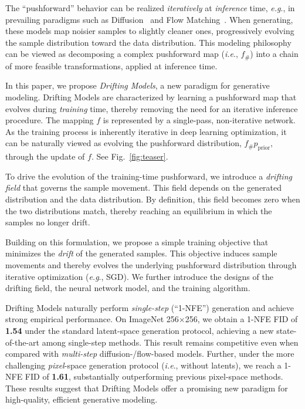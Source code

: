 \documentclass{article}
\def\onedot{.}
\def\eg{\emph{e.g}\onedot} \def\Eg{\emph{E.g}\onedot}
\def\ie{\emph{i.e}\onedot} \def\Ie{\emph{I.e}\onedot}
\theoremstyle{plain}
\theoremstyle{definition}
\theoremstyle{remark}
\begin{document}
The ``pushforward'' behavior can be realized \textit{iteratively} at \textit{inference} time, \eg, in prevailing paradigms such as Diffusion~\cite{sohl2015deep} and Flow Matching~\cite{lipman2022flow}. When generating, these models map noisier samples to slightly cleaner ones, progressively evolving the sample distribution toward the data distribution.
This modeling philosophy can be viewed as decomposing a complex pushforward map (\ie, $f_\#$) into a chain of more feasible transformations, applied at inference time.

In this paper, we propose \emph{Drifting Models}, a new paradigm for generative
modeling. Drifting Models are characterized by learning a pushforward map that evolves during \textit{training} time, thereby removing the need for an iterative inference procedure. The mapping $f$ is represented by a single-pass, non-iterative network. As the training process is inherently iterative in deep learning optimization, it can be naturally viewed as evolving the pushforward
distribution, $f_\# p_\text{prior}$, through the update of $f$. See Fig.~\ref{fig:teaser}.

To drive the evolution of the training-time pushforward, we introduce a
\emph{drifting field} that governs the sample movement.
This field depends on the generated distribution and the data distribution.
By definition, this field becomes zero when the two distributions match, thereby reaching an equilibrium in which the samples no longer drift.

Building on this formulation, we propose a simple training objective that minimizes the \textit{drift} of the generated samples. This objective induces sample movements and thereby evolves the underlying pushforward distribution through iterative optimization (\eg, SGD). We further introduce the designs of the drifting field, the neural network model, and the training algorithm.

Drifting Models naturally perform \textit{single-step} (\mbox{``1-NFE''}) generation and achieve strong empirical performance.
On ImageNet 256$\times$256, we obtain a 1-NFE
FID of \textbf{1.54} under the standard latent-space generation protocol, achieving a new state-of-the-art among single-step methods. This result remains competitive even when compared with \textit{multi-step} diffusion-/flow-based models.
Further, under the more challenging \textit{pixel}-space generation protocol (\ie, without latents), we reach a 1-NFE FID of \textbf{1.61}, substantially outperforming previous pixel-space methods.
These results suggest that Drifting Models offer a promising new paradigm for high-quality, efficient generative modeling.
\end{document}
